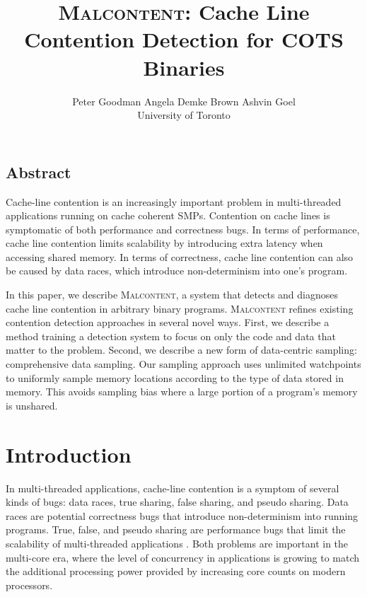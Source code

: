 \documentclass[letterpaper,twocolumn,10pt]{article}
\newcommand{\TextToolname}{Malcontent}
\newcommand{\Toolname}{\textsc{\TextToolname{}}}
\begin{document}
\date{}

\title{\Large \bf \Toolname: Cache Line Contention Detection for COTS Binaries}
\author{
{\rm Peter Goodman} \hspace{1.5em} {\rm Angela Demke Brown} \hspace{1.5em} {\rm Ashvin Goel}\\
University of Toronto
} %
\maketitle


\subsection*{Abstract}
Cache-line contention is an increasingly important problem in multi-threaded applications running on cache coherent SMPs.
Contention on cache lines is symptomatic of both performance and correctness bugs. In terms of performance, cache line
contention limits scalability by introducing extra latency when accessing shared memory.  In terms of correctness, cache
line contention can also be caused by data races, which introduce non-determinism into one's program.

In this paper, we describe \Toolname, a system that detects and diagnoses cache line contention in arbitrary binary programs.
\Toolname{} refines existing contention detection approaches in several novel ways. First, we describe a method training
a detection system to focus on only the code and data that matter to the problem. Second, we describe a new form of
data-centric sampling: comprehensive data sampling. Our sampling approach uses unlimited watchpoints to uniformly
sample memory locations according to the type of data stored in memory. This avoids sampling bias where a large portion
of a program's memory is unshared.

\section{Introduction}\label{sec:intro}

In multi-threaded applications, cache-line contention is a symptom of several kinds of bugs: data races, true sharing,
false sharing, and pseudo sharing. Data races are potential correctness bugs that introduce non-determinism into running
programs. True, false, and pseudo sharing are performance bugs that limit the scalability of multi-threaded applications
\cite{ImpactOfFalseSharing}. Both problems are important in the multi-core era, where the level of concurrency in
applications is growing to match the additional processing power provided by increasing core counts on modern processors.
\end{document}
